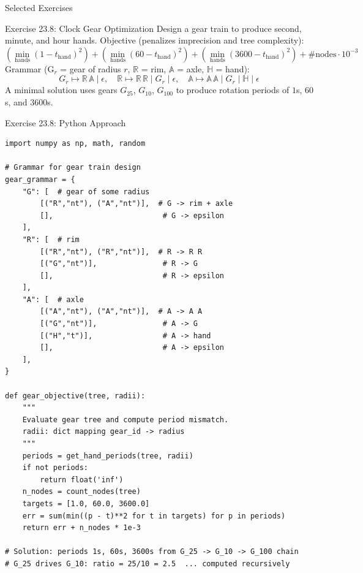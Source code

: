 \documentclass[aspectratio=169,10pt]{beamer}
\begin{document}
\begin{frame}[allowframebreaks]{Selected Exercises}
  \framebreak

  \begin{block}{Exercise 23.8: Clock Gear Optimization}
    Design a gear train to produce second, minute, and hour hands.
    Objective (penalizes imprecision and tree complexity):
    \[
      \left(\min_{\text{hands}}\!(1-t_{\text{hand}})^2\right)
      + \left(\min_{\text{hands}}\!(60-t_{\text{hand}})^2\right)
      + \left(\min_{\text{hands}}\!(3600-t_{\text{hand}})^2\right)
      + \#\text{nodes}\cdot 10^{-3}
    \]
    Grammar (G$_r$ = gear of radius $r$, $\mathbb{R}$ = rim, $\mathbb{A}$ = axle, $\mathbb{H}$ = hand):
    \[
      G_r \mapsto \mathbb{R}\,\mathbb{A} \mid \epsilon, \quad
      \mathbb{R} \mapsto \mathbb{R}\,\mathbb{R} \mid G_r \mid \epsilon, \quad
      \mathbb{A} \mapsto \mathbb{A}\,\mathbb{A} \mid G_r \mid \mathbb{H} \mid \epsilon
    \]
    A minimal solution uses gears $G_{25}$, $G_{10}$, $G_{100}$ to
    produce rotation periods of $1$s, $60$s, and $3600$s.
  \end{block}
\end{frame}

\begin{frame}[fragile]{Exercise 23.8: Python Approach}
\begin{lstlisting}[style=python]
import numpy as np, math, random

# Grammar for gear train design
gear_grammar = {
    "G": [  # gear of some radius
        [("R","nt"), ("A","nt")],  # G -> rim + axle
        [],                         # G -> epsilon
    ],
    "R": [  # rim
        [("R","nt"), ("R","nt")],  # R -> R R
        [("G","nt")],               # R -> G
        [],                         # R -> epsilon
    ],
    "A": [  # axle
        [("A","nt"), ("A","nt")],  # A -> A A
        [("G","nt")],               # A -> G
        [("H","t")],                # A -> hand
        [],                         # A -> epsilon
    ],
}

def gear_objective(tree, radii):
    """
    Evaluate gear tree and compute period mismatch.
    radii: dict mapping gear_id -> radius
    """
    periods = get_hand_periods(tree, radii)
    if not periods:
        return float('inf')
    n_nodes = count_nodes(tree)
    targets = [1.0, 60.0, 3600.0]
    err = sum(min((p - t)**2 for t in targets) for p in periods)
    return err + n_nodes * 1e-3

# Solution: periods 1s, 60s, 3600s from G_25 -> G_10 -> G_100 chain
# G_25 drives G_10: ratio = 25/10 = 2.5  ... computed recursively
\end{lstlisting}
\end{frame}
\end{document}
